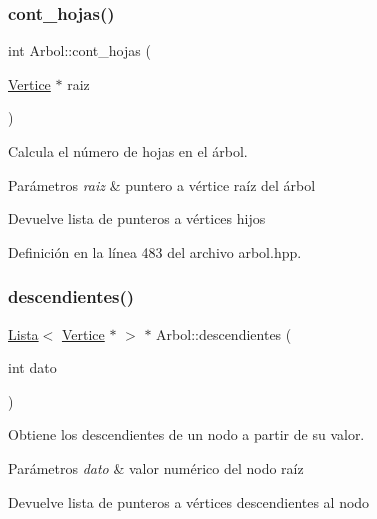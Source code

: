 \subsubsection{\texorpdfstring{cont\+\_\+hojas()}{cont\_hojas()}}
{\footnotesize\ttfamily int Arbol\+::cont\+\_\+hojas (\begin{DoxyParamCaption}\item[{\hyperlink{classVertice}{Vertice} $\ast$}]{raiz }\end{DoxyParamCaption})}



Calcula el número de hojas en el árbol. 


\begin{DoxyParams}{Parámetros}
{\em raiz} & puntero a vértice raíz del árbol \\
\hline
\end{DoxyParams}
\begin{DoxyReturn}{Devuelve}
lista de punteros a vértices hijos 
\end{DoxyReturn}


Definición en la línea 483 del archivo arbol.\+hpp.

\mbox{\label{classArbol_acae8e9dfd17ae18e250d9029172e1c9e}} 
\subsubsection{\texorpdfstring{descendientes()}{descendientes()}\hspace{0.1cm}{\footnotesize\ttfamily [1/2]}}
{\footnotesize\ttfamily \hyperlink{classLista}{Lista}$<$ \hyperlink{classVertice}{Vertice} $\ast$ $>$ $\ast$ Arbol\+::descendientes (\begin{DoxyParamCaption}\item[{int}]{dato }\end{DoxyParamCaption})}



Obtiene los descendientes de un nodo a partir de su valor. 


\begin{DoxyParams}{Parámetros}
{\em dato} & valor numérico del nodo raíz \\
\hline
\end{DoxyParams}
\begin{DoxyReturn}{Devuelve}
lista de punteros a vértices descendientes al nodo 
\end{DoxyReturn}


